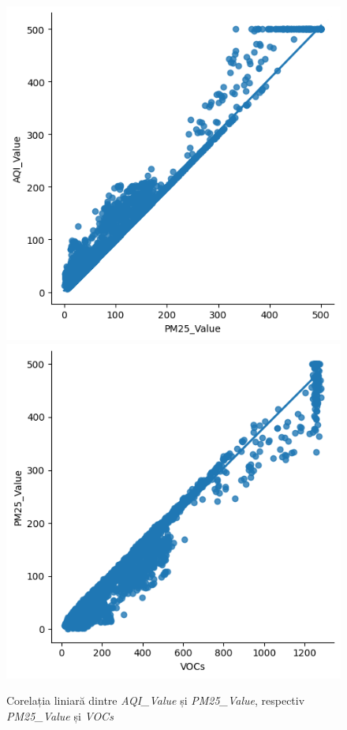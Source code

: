 \documentclass{article}
\begin{document}
\begin{figure}[htb]
    \centering
    \includegraphics[scale=0.5]{air_pollution/analysis/correlation/aqi-pm25.png}
    \includegraphics[scale=0.5]{air_pollution/analysis/correlation/pm25-vocs.png}
    \caption{Corelația liniară dintre \textit{AQI\_Value} și 
    \textit{PM25\_Value}, respectiv \textit{PM25\_Value} și \textit{VOCs}}
    \label{fig:pol:corr_graphs}
\end{figure}
\end{document}
